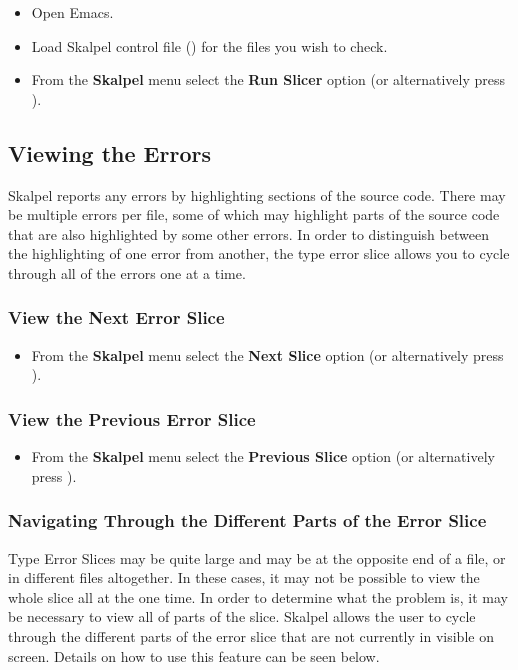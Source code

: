 \documentclass{article}
\begin{document}
\begin{itemize}
\item Open Emacs.
\item Load Skalpel control file () for
  the files you wish to check.

\item From the \textbf{Skalpel} menu select the \textbf{Run Slicer}
  option (or alternatively press ).
\end{itemize}


\subsection{Viewing the Errors}

Skalpel reports any errors by highlighting sections of
the source code. There may be multiple errors per file, some of which
may highlight parts of the source code that are also highlighted by
some other errors. In order to distinguish between the highlighting
of one error from another, the type error slice allows you to cycle
through all of the errors one at a time.

\subsubsection{View the Next Error Slice}

\begin{itemize}
\item From the \textbf{Skalpel} menu select the \textbf{Next Slice}
  option (or alternatively press ).
\end{itemize}

\subsubsection{View the Previous Error Slice}

\begin{itemize}
\item From the \textbf{Skalpel} menu select the \textbf{Previous Slice}
  option (or alternatively press ).
\end{itemize}

\subsubsection{Navigating Through the Different Parts of the Error Slice}
Type Error Slices may be quite large and may be at the opposite end of
a file, or in different files altogether. In these cases, it may not
be possible to view the whole slice all at the one time. In order to
determine what the problem is, it may be necessary to view all of
parts of the slice. Skalpel allows the user to cycle
through the different parts of the error slice that are not currently
in visible on screen. Details on how to use this feature can be seen below.
\end{document}
